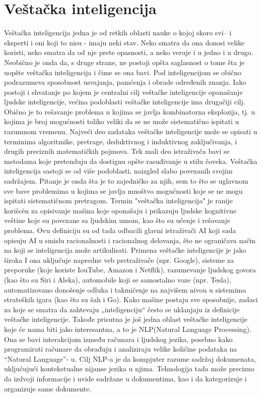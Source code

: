 \documentclass[a4paper]{article}
\begin{document}
\section{Veštačka inteligencija}
\label{Veštačka inteligencija}
Veštačka inteligencija jedna je od retkih oblasti nauke o kojoj skoro svi– i eksperti i oni koji to nisu - imaju neki stav. Neko smatra da ona donosi velike koristi, neko smatra da od nje prete opasnosti, a neko veruje i u jedno i u drugo. Neobično je onda da, s druge strane, ne postoji opšta saglasnost o tome šta je uopšte veštačka inteligencija i čime se ona bavi. Pod inteligencijom se obično podrazumeva sposobnost usvajanja, pamćenja i obrade određenih znanja. Iako postoji i shvatanje po kojem je centralni cilj veštačke inteligencije oponašanje ljudske inteligencije, većina podoblasti veštačke inteligencije ima drugačiji cilj. Obično je to rešavanje problema u kojima se javlja kombinatorna eksplozija, tj. u kojima je broj mogućnosti toliko veliki da se ne može sistematično ispitati u razumnom vremenu. Najveći deo zadataka veštačke inteligencije može se opisati u terminima algoritmike, pretrage, deduktivnog i induktivnog zaključivanja, i drugih preciznih matematičkih pojmova. Tek mali deo istraživača bavi se metodama koje pretenduju da dostignu opšte rasuđivanje u stilu čoveka. Veštačka inteligencija sastoji se od više podoblasti, naizgled slabo povezanih svojim sadržajem. Pitanje je onda šta je to zajedničko za njih, sem to što se uglavnom sve bave problemima u kojima se javlja mnoštvo mogućnosti koje se ne mogu ispitati sistematičnom pretragom. Termin "veštačka inteligencija" je ranije korišcén za opisivanje mašina koje oponašaju i prikazuju ljudske kognitivne veštine koje su povezane sa ljudskim umom, kao što su učenje i rešavanje problema. Ovu definiciju su od tada odbacili glavni istraživači AI koji sada opisuju AI u smislu racionalnosti i racionalnog delovanja, što ne ograničava način na koji se inteligencija može artikulisati.
\newpage
Primena veštačke inteligencije je jako široka I ona uključuje napredne veb pretraživače (npr. Google), sisteme za preporuke (koje koriste IouTube, Amazon i Netflik), razumevanje ljudskog govora (kao što su Siri i Aleka), automobile koji se samostalno voze (npr. Tesla), automatizovano donošenje odluka i takmičenje na najvišem nivou u sistemima strateških igara (kao što su šah i Go). Kako mašine postaju sve sposobnije, zadaci za koje se smatra da zahtevaju „inteligenciju“ često se uklanjaju iz definicije veštačke inteligencije. Takođe prisutna je još jedna oblast veštačke inteligencije koje će nama biti jako interesantna, a to je NLP(Natural Language Processing). Ona se bavi interakcijom između računara i ljudskog jezika, posebno kako programirati računare da obrađuju i analiziraju velike količine podataka na “Natural Language”- u. Cilj NLP-a je da kompjuter razume sadržaj dokumenata, uključujući kontekstualne nijanse jezika u njima. Tehnologija tada može precizno da izdvoji informacije i uvide sadržane u dokumentima, kao i da kategorizuje i organizuje same dokumente.
\end{document}
